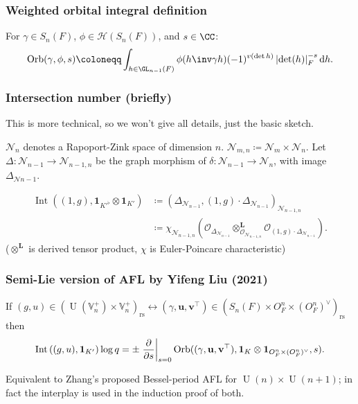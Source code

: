 \documentclass[11pt]{beamer}
\DeclareMathOperator{\Int}{Int}
\DeclareMathOperator{\Orb}{Orb}
\DeclareMathOperator{\U}{U}
\newcommand{\HH}{\mathcal{H}}
\newcommand{\VV}{\mathbb{V}}
\renewcommand{\OO}{O}
\newcommand{\RZ}{\mathcal{N}}
\newcommand{\Sheaf}{\mathcal O}
\newcommand{\guv}{{(\gamma, \uu, \vv^\top)}}
\newcommand{\jiao}{\mathop{\otimes}^{\mathbf{L}}} %
\newcommand{\oneV}{\mathbf{1}_{\OO_F^n \times (\OO_F^n)^\vee}}
\newcommand{\rs}{_{\text{rs}}}
\newcommand{\uu}{\mathbf{u}}
\newcommand{\vv}{\mathbf{v}}
\begin{document}
\begin{frame}
  \frametitle{Weighted orbital integral definition}
  For $\gamma \in S_n(F)$, $\phi \in \HH(S_n(F))$, and $s \in \CC$:
  \[ \Orb(\gamma, \phi, s) \coloneqq
    \int_{h \in \GL_{n-1}(F)} \phi(h\inv \gamma h) (-1)^{v(\det h)}
    \left\lvert \det(h) \right\rvert_F^{-s} \odif h. \]
\end{frame}

\begin{frame}
  \frametitle{Intersection number (briefly)}
  This is more technical, so we won't give all details, just the basic sketch.
  \begin{itemize}
    \ii $\RZ_n$ denotes a Rapoport-Zink space of dimension $n$.
    \ii $\RZ_{m,n} \coloneqq \RZ_m \times \RZ_n$.
    \ii Let $\Delta: \RZ_{n-1} \to \RZ_{n-1,n}$
    be the graph morphism of $\delta \colon \RZ_{n-1} \to \RZ_n$,
    with image $\Delta_{\RZ{n-1}}$.
  \end{itemize}
  \begin{definition}
    \begin{align*}
      \Int((1,g), \mathbf{1}_{K'^\flat} \otimes \mathbf{1}_{K'})
      &\coloneqq \left( \Delta_{\RZ_{n-1}}, (1,g) \cdot \Delta_{\RZ_{n-1}} \right)_{\RZ_{n-1,n}} \\
      &\coloneqq \chi_{\RZ_{n-1,n}}
      \left( \Sheaf_{\Delta_{\RZ_{n-1}}} \jiao_{\Sheaf_{\RZ_{n-1,n}}} \Sheaf_{(1,g) \cdot \Delta_{\RZ_{n-1}}} \right) .
    \end{align*}
    ($\jiao$ is derived tensor product, $\chi$ is Euler-Poincare characteristic)
  \end{definition}
\end{frame}

\begin{frame}
  \frametitle{Semi-Lie version of AFL by Yifeng Liu (2021)}
  \begin{theorem}
    If $(g, u) \in (\U(\VV_n^+) \times \VV_n^+)\rs \longleftrightarrow
      (\gamma, \uu, \vv^\top) \in (S_n(F) \times \OO_F^n \times (\OO_F^n)^\vee)\rs$
    then
    \[
      \Int\left( (g,u), \mathbf{1}_{K'} \right) \log q
      = \pm \left. \pdv{}{s} \right\rvert_{s=0}
      \Orb(\guv, \mathbf{1}_K \otimes \oneV, s).
    \]
  \end{theorem}
  Equivalent to Zhang's proposed Bessel-period AFL for $\U(n) \times \U(n+1)$;
  in fact the interplay is used in the induction proof of both.
\end{frame}
\end{document}
